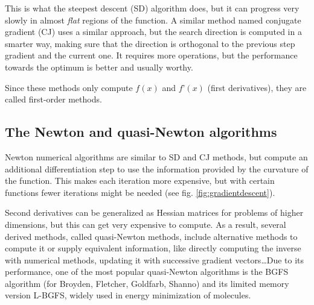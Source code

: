 This is what the steepest descent (SD) algorithm does, but it can progress very slowly in almost \textit{flat} regions of the function. A similar method named conjugate gradient (CJ) uses a similar approach, but the search direction is computed in a smarter way, making sure that the direction is orthogonal to the previous step gradient and the current one. It requires more operations, but the performance towards the optimum is better and usually worthy.

Since these methods only compute $f(x)$ and $f’(x)$ (first derivatives), they are called first-order methods.

\subsection{The Newton and quasi-Newton algorithms}
Newton numerical algorithms are similar to SD and CJ methods, but compute an additional differentiation step to use the information provided by the curvature of the function. This makes each iteration more expensive, but with certain functions fewer iterations might be needed (see fig. \ref{fig:gradientdescent}).

Second derivatives can be generalized as Hessian matrices for problems of higher dimensions, but this can get very expensive to compute. As a result, several derived methods, called quasi-Newton methods, include alternative methods to compute it or supply equivalent information, like directly computing the inverse with numerical methods, updating it with successive gradient vectors\ldots  Due to its performance, one of the most popular quasi-Newton algorithms is the BGFS algorithm (for Broyden, Fletcher, Goldfarb, Shanno) and its limited memory version L-BGFS, widely used in energy minimization of molecules.


